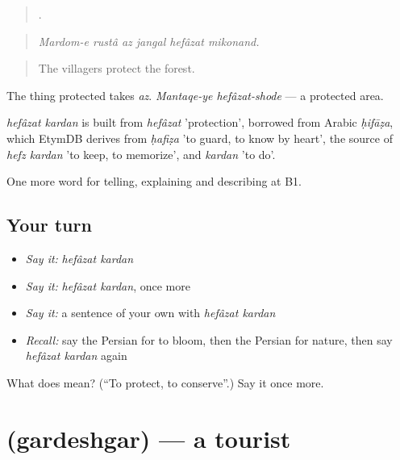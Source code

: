 \begin{quote}
     .
\end{quote}

\begin{quote}
\emph{Mardom-e rustâ az jangal hefâzat mikonand.}
\end{quote}

\begin{quote}
The villagers protect the forest.
\end{quote}

The thing protected takes \emph{az}. \emph{Mantaqe-ye hefâzat-shode} — a protected area.

\begin{cousinweb}
\emph{hefâzat kardan} is built from \emph{hefâzat} 'protection', borrowed from Arabic \emph{ḥifāẓa}, which EtymDB derives from \emph{ḥafiẓa} 'to guard, to know by heart', the source of \emph{hefz kardan} 'to keep, to memorize', and \emph{kardan} 'to do'.
\end{cousinweb}

\begin{grammarlens}[title={What you've built}]
One more word for telling, explaining and describing at B1.
\end{grammarlens}

\subsection*{Your turn}
\begin{itemize}
\raggedright
  \item \emph{Say it:} \emph{hefâzat kardan}
  \item \emph{Say it:} \emph{hefâzat kardan}, once more
  \item \emph{Say it:} a sentence of your own with \emph{hefâzat kardan}
  \item \emph{Recall:} say the Persian for to bloom, then the Persian for nature, then say \emph{hefâzat kardan} again
\end{itemize}

\begin{tcolorbox}[breakable,colback=teal!4,colframe=teal!35!black,title={Before you move on}]
What does   mean? (\textquotedblleft{}To protect, to conserve\textquotedblright{}.) Say it once more.
\end{tcolorbox}
\section[\texorpdfstring{\fa{گردشگر} (gardeshgar)}{گردشگر (gardeshgar)}]{ (gardeshgar) — a tourist}

